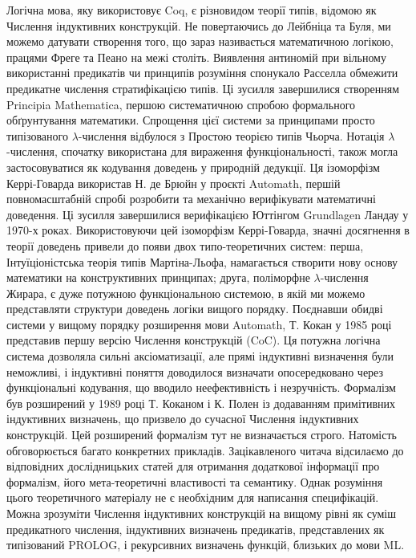 \documentclass{article}
\begin{document}
Логічна мова, яку використовує Coq, є різновидом теорії типів, відомою як Числення індуктивних конструкцій. Не повертаючись до Лейбніца та Буля, ми можемо датувати створення того, що зараз називається математичною логікою, працями Фреге та Пеано на межі століть. Виявлення антиномій при вільному використанні предикатів чи принципів розуміння спонукало Расселла обмежити предикатне числення стратифікацією типів. Ці зусилля завершилися створенням Principia Mathematica, першою систематичною спробою формального обґрунтування математики. Спрощення цієї системи за принципами просто типізованого $\lambda$-числення відбулося з Простою теорією типів Чьорча. Нотація $\lambda$-числення, спочатку використана для вираження функціональності, також могла застосовуватися як кодування доведень у природній дедукції. Ця ізоморфізм Керрі-Говарда використав Н. де Брюйн у проєкті Automath, першій повномасштабній спробі розробити та механічно верифікувати математичні доведення. Ці зусилля завершилися верифікацією Юттінгом Grundlagen Ландау у 1970-х роках. Використовуючи цей ізоморфізм Керрі-Говарда, значні досягнення в теорії доведень привели до появи двох типо-теоретичних систем: перша, Інтуїціоністська теорія типів Мартіна-Льофа, намагається створити нову основу математики на конструктивних принципах; друга, поліморфне $\lambda$-числення Жирара, є дуже потужною функціональною системою, в якій ми можемо представляти структури доведень логіки вищого порядку. Поєднавши обидві системи у вищому порядку розширення мови Automath, Т. Кокан у 1985 році представив першу версію Числення конструкцій (CoC). Ця потужна логічна система дозволяла сильні аксіоматизації, але прямі індуктивні визначення були неможливі, і індуктивні поняття доводилося визначати опосередковано через функціональні кодування, що вводило неефективність і незручність. Формалізм був розширений у 1989 році Т. Коканом і К. Полен із додаванням примітивних індуктивних визначень, що призвело до сучасної Числення індуктивних конструкцій. Цей розширений формалізм тут не визначається строго. Натомість обговорюється багато конкретних прикладів. Зацікавленого читача відсилаємо до відповідних дослідницьких статей для отримання додаткової інформації про формалізм, його мета-теоретичні властивості та семантику. Однак розуміння цього теоретичного матеріалу не є необхідним для написання специфікацій. Можна зрозуміти Числення індуктивних конструкцій на вищому рівні як суміш предикатного числення, індуктивних визначень предикатів, представлених як типізований PROLOG, і рекурсивних визначень функцій, близьких до мови ML.
\end{document}
